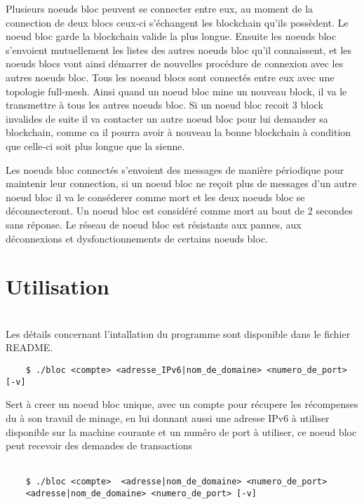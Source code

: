\documentclass[a4paper,11pt,DIV=12]{scrreprt}
\begin{document}
    Plusieurs noeuds bloc peuvent se connecter entre eux, au moment de la
    connection de deux blocs ceux-ci s'échangent les blockchain qu'ils
    possèdent. Le noeud bloc garde la blockchain valide la plus longue.
    Ensuite les noeuds bloc s'envoient mutuellement les listes des
    autres noeuds bloc qu'il connaissent, et les noeuds blocs vont ainsi démarrer de nouvelles
    procédure de connexion avec les autres noeuds bloc. Tous les noeaud blocs sont
    connectés entre eux avec une topologie full-mesh. Ainsi quand un noeud bloc
    mine un nouveau block, il va le transmettre à tous les autres noeuds bloc. 
    Si un noeud bloc recoit 3 block invalides de suite il va contacter un autre
    noeud bloc pour lui demander sa blockchain, comme ca il pourra avoir à
    nouveau la bonne blockchain à condition que celle-ci soit plus longue que
    la sienne.

    Les noeuds bloc connectés s'envoient des messages de manière périodique pour
    maintenir leur connection, si un noeud bloc ne reçoit plus de messages d'un
    autre noeud bloc il va le conséderer comme mort et les deux noeuds bloc se
    déconnecteront. Un noeud bloc est considéré comme mort au bout de 2 secondes
    sans réponse. Le réseau de noeud bloc est résistants aux pannes, aux
    déconnexions et dysfonctionnements de certains noeuds bloc. 

    \chapter{Utilisation}

    \ \\
    Les détails concernant l'intallation du programme sont disponible dans le fichier README.
    \\


    \begin{lstlisting}
    $ ./bloc <compte> <adresse_IPv6|nom_de_domaine> <numero_de_port> [-v]
    \end{lstlisting}

    Sert à creer un noeud bloc unique, avec un compte pour récupere les
    récompenses du à son travail de minage, en lui donnant aussi une adresse IPv6 à utiliser
    disponible sur la machine courante et un numéro de port à utiliser, 
    ce noeud bloc peut recevoir des demandes de transactions 
    \\ \\

    \begin{lstlisting}
    $ ./bloc <compte>  <adresse|nom_de_domaine> <numero_de_port>
    <adresse|nom_de_domaine> <numero_de_port> [-v]
    \end{lstlisting}
\end{document}
